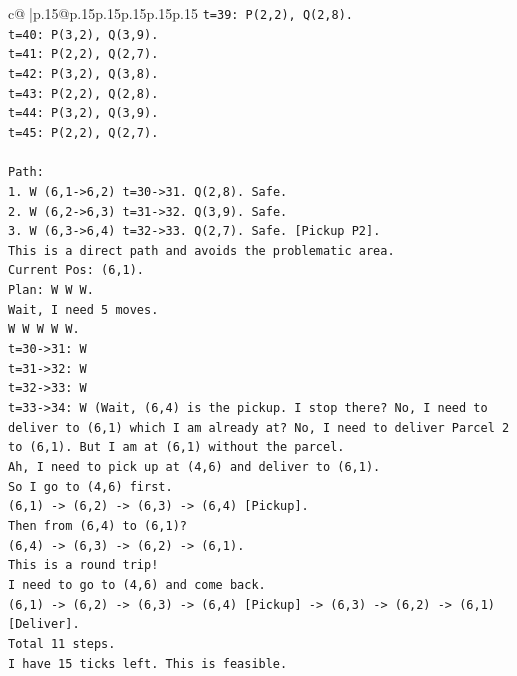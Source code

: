 \documentclass{article}
\begin{document}
{\begin{supertabular}{c@{$\;$}|p{.15\linewidth}@{}p{.15\linewidth}p{.15\linewidth}p{.15\linewidth}p{.15\linewidth}p{.15\linewidth}}
{{{\texttt{t=39: P(2,2), Q(2,8).} \\
\texttt{t=40: P(3,2), Q(3,9).} \\
\texttt{t=41: P(2,2), Q(2,7).} \\
\texttt{t=42: P(3,2), Q(3,8).} \\
\texttt{t=43: P(2,2), Q(2,8).} \\
\texttt{t=44: P(3,2), Q(3,9).} \\
\texttt{t=45: P(2,2), Q(2,7).} \\
\\ 
\texttt{Path:} \\
\texttt{1. W (6,1{-}>6,2) t=30{-}>31. Q(2,8). Safe.} \\
\texttt{2. W (6,2{-}>6,3) t=31{-}>32. Q(3,9). Safe.} \\
\texttt{3. W (6,3{-}>6,4) t=32{-}>33. Q(2,7). Safe. {[}Pickup P2{]}.} \\
\texttt{This is a direct path and avoids the problematic area.} \\
\texttt{Current Pos: (6,1).} \\
\texttt{Plan: W W W.} \\
\texttt{Wait, I need 5 moves.} \\
\texttt{W W W W W.} \\
\texttt{t=30{-}>31: W} \\
\texttt{t=31{-}>32: W} \\
\texttt{t=32{-}>33: W} \\
\texttt{t=33{-}>34: W (Wait, (6,4) is the pickup. I stop there? No, I need to deliver to (6,1) which I am already at? No, I need to deliver Parcel 2 to (6,1). But I am at (6,1) without the parcel.} \\
\texttt{Ah, I need to pick up at (4,6) and deliver to (6,1).} \\
\texttt{So I go to (4,6) first.} \\
\texttt{(6,1) {-}> (6,2) {-}> (6,3) {-}> (6,4) {[}Pickup{]}.} \\
\texttt{Then from (6,4) to (6,1)?} \\
\texttt{(6,4) {-}> (6,3) {-}> (6,2) {-}> (6,1).} \\
\texttt{This is a round trip!} \\
\texttt{I need to go to (4,6) and come back.} \\
\texttt{(6,1) {-}> (6,2) {-}> (6,3) {-}> (6,4) {[}Pickup{]} {-}> (6,3) {-}> (6,2) {-}> (6,1) {[}Deliver{]}.} \\
\texttt{Total 11 steps.} \\
\texttt{I have 15 ticks left. This is feasible.} \\
}}}
\end{supertabular}}
\end{document}
